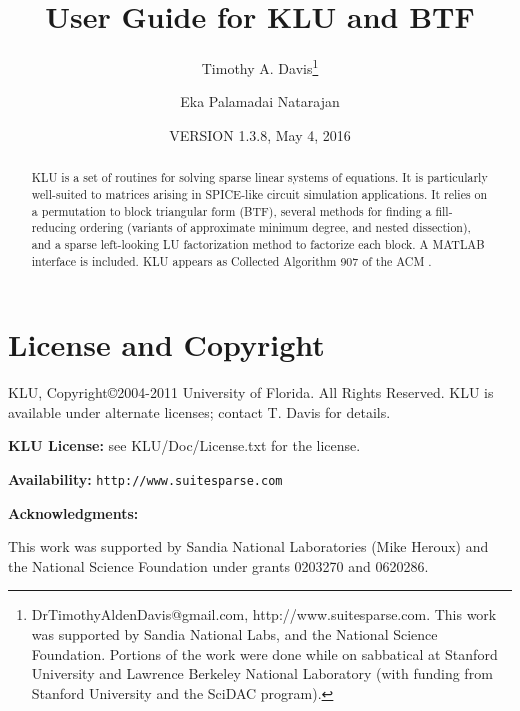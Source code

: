 \documentclass[11pt]{article}
\begin{document}

\title{User Guide for KLU and BTF}
\author{
Timothy A. Davis\thanks{
DrTimothyAldenDavis@gmail.com,
http://www.suitesparse.com.
This work was supported by Sandia National Labs, and the National
Science Foundation.
Portions of the work were done while on sabbatical at Stanford University
and Lawrence Berkeley National Laboratory (with funding from Stanford
University and the SciDAC program).
}
\and Eka Palamadai Natarajan}

\date{VERSION 1.3.8, May 4, 2016}
\maketitle

\begin{abstract}
KLU is a set of routines for solving sparse linear systems of equations.
It is particularly well-suited to matrices arising in SPICE-like circuit
simulation applications.
It relies on a permutation to block triangular form (BTF), several methods
for finding a fill-reducing ordering (variants of approximate minimum degree,
and nested dissection), and a sparse left-looking LU factorization method
to factorize each block.  A MATLAB interface is included.
KLU appears as Collected Algorithm 907 of the ACM \cite{DavisNatarajan10}.
\end{abstract}

\newpage
\tableofcontents
\newpage

\section{License and Copyright}

KLU, Copyright\copyright 2004-2011 University of Florida.
All Rights Reserved.
KLU is available under alternate licenses; contact T. Davis for details.

{\bf KLU License:} see KLU/Doc/License.txt for the license.

{\bf Availability:} {\tt http://www.suitesparse.com}

{\bf Acknowledgments:}

    This work was supported by Sandia National Laboratories (Mike Heroux)
    and the National Science Foundation under grants 0203270 and 0620286.
\end{document}

